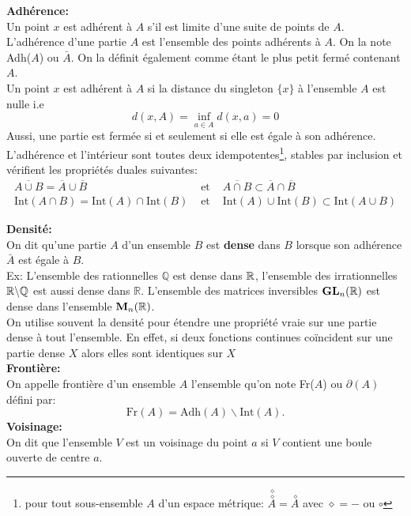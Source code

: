 \documentclass[12pt,a4paper]{article}
\begin{document}
	\textbf{Adhérence:}\\ 
	Un point $x$ est adhérent à $A$ s'il est limite d'une suite de points de $A$.
	L'adhérence d'une partie $A$ est l'ensemble des points adhérents à $A$. On la note Adh($A$) ou $\bar{A}$.
	On la définit également comme étant le plus petit fermé contenant $A$.\\
	Un point $x$ est adhérent à $A$ si la distance du singleton $\lbrace x \rbrace $ à l'ensemble $A$ est nulle i.e 
	\[d(x,A)=\inf\limits_{a\in A} d(x,a) =0\]
	Aussi, une partie est fermée si et seulement si elle est égale à son adhérence.\\
	L'adhérence et l'intérieur sont toutes deux idempotentes\footnote{pour tout sous-ensemble $A$ d'un espace  métrique:
		$\overset{\,\diamond}{\overset{\,\diamond}{A}}=\overset{\,\diamond}{A}$ avec $\diamond=-$ ou $\circ$}, stables par inclusion et vérifient les propriétés duales suivantes:
	\begin{eqnarray}
		\overline{A\cup B}=\overline{A}\cup \overline{B} &\text{ et }& \overline{A\cap B}\subset \overline{A}\cap \overline{B}\\
		\text{Int}\left(A\cap B \right)=\text{Int}(A)\cap \text{Int}(B) &\text{ et }& \text{Int}(A)\cup \text{Int}(B)\subset\text{Int}\left(A\cup B \right)
	\end{eqnarray}
	
	\textbf{Densité:}\\
	On dit qu'une partie $A$ d'un ensemble $B$ est \textbf{dense} dans $B$ lorsque son adhérence $\bar{A}$ est égale à $B$.\\
	Ex: L'ensemble des rationnelles $\mathbb{Q}$ est dense dans $\mathbb{R}$, l'ensemble des irrationnelles $\mathbb{R}\backslash \mathbb{Q} $ est aussi dense dans $\mathbb{R}$. L'ensemble des matrices inversibles $\mathbf{GL}_n (\mathbb{R})$ est dense dans l'ensemble $\mathbf{M}_n(\mathbb{R})$.\\
	On utilise souvent la densité pour étendre une propriété vraie sur une partie dense à tout l'ensemble. En effet, si deux fonctions continues coïncident sur une partie dense $X$ alors elles sont identiques sur $X$\\
	
	\textbf{Frontière:}\\ On appelle frontière d'un ensemble $A$ l'ensemble qu'on note Fr($A$) ou $\partial(A)$ défini par:\[\text{Fr}(A)=\text{Adh}(A)\backslash \text{Int}(A) .\]
	\textbf{Voisinage:} \\On dit que l'ensemble $V$ est un voisinage du point $a$ si $V$ contient une boule ouverte de centre $a$.
\end{document}
